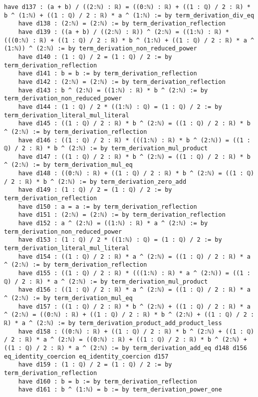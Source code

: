 \documentclass{article}
\begin{document}
\begin{tcolorbox}[colback=white!10, width=\linewidth]
\begin{lstlisting}[language=Lean4]
    have d137 : (a + b) / ((2:ℕ) : ℝ) = ((0:ℕ) : ℝ) + ((1 : ℚ) / 2 : ℝ) * b ^ (1:ℕ) + ((1 : ℚ) / 2 : ℝ) * a ^ (1:ℕ) := by term_derivation_div_eq
    have d138 : (2:ℕ) = (2:ℕ) := by term_derivation_reflection
    have d139 : ((a + b) / ((2:ℕ) : ℝ)) ^ (2:ℕ) = ((1:ℕ) : ℝ) * (((0:ℕ) : ℝ) + ((1 : ℚ) / 2 : ℝ) * b ^ (1:ℕ) + ((1 : ℚ) / 2 : ℝ) * a ^ (1:ℕ)) ^ (2:ℕ) := by term_derivation_non_reduced_power
    have d140 : (1 : ℚ) / 2 = (1 : ℚ) / 2 := by term_derivation_reflection
    have d141 : b = b := by term_derivation_reflection
    have d142 : (2:ℕ) = (2:ℕ) := by term_derivation_reflection
    have d143 : b ^ (2:ℕ) = ((1:ℕ) : ℝ) * b ^ (2:ℕ) := by term_derivation_non_reduced_power
    have d144 : (1 : ℚ) / 2 * ((1:ℕ) : ℚ) = (1 : ℚ) / 2 := by term_derivation_literal_mul_literal
    have d145 : ((1 : ℚ) / 2 : ℝ) * b ^ (2:ℕ) = ((1 : ℚ) / 2 : ℝ) * b ^ (2:ℕ) := by term_derivation_reflection
    have d146 : ((1 : ℚ) / 2 : ℝ) * (((1:ℕ) : ℝ) * b ^ (2:ℕ)) = ((1 : ℚ) / 2 : ℝ) * b ^ (2:ℕ) := by term_derivation_mul_product
    have d147 : ((1 : ℚ) / 2 : ℝ) * b ^ (2:ℕ) = ((1 : ℚ) / 2 : ℝ) * b ^ (2:ℕ) := by term_derivation_mul_eq
    have d148 : ((0:ℕ) : ℝ) + ((1 : ℚ) / 2 : ℝ) * b ^ (2:ℕ) = ((1 : ℚ) / 2 : ℝ) * b ^ (2:ℕ) := by term_derivation_zero_add
    have d149 : (1 : ℚ) / 2 = (1 : ℚ) / 2 := by term_derivation_reflection
    have d150 : a = a := by term_derivation_reflection
    have d151 : (2:ℕ) = (2:ℕ) := by term_derivation_reflection
    have d152 : a ^ (2:ℕ) = ((1:ℕ) : ℝ) * a ^ (2:ℕ) := by term_derivation_non_reduced_power
    have d153 : (1 : ℚ) / 2 * ((1:ℕ) : ℚ) = (1 : ℚ) / 2 := by term_derivation_literal_mul_literal
    have d154 : ((1 : ℚ) / 2 : ℝ) * a ^ (2:ℕ) = ((1 : ℚ) / 2 : ℝ) * a ^ (2:ℕ) := by term_derivation_reflection
    have d155 : ((1 : ℚ) / 2 : ℝ) * (((1:ℕ) : ℝ) * a ^ (2:ℕ)) = ((1 : ℚ) / 2 : ℝ) * a ^ (2:ℕ) := by term_derivation_mul_product
    have d156 : ((1 : ℚ) / 2 : ℝ) * a ^ (2:ℕ) = ((1 : ℚ) / 2 : ℝ) * a ^ (2:ℕ) := by term_derivation_mul_eq
    have d157 : ((1 : ℚ) / 2 : ℝ) * b ^ (2:ℕ) + ((1 : ℚ) / 2 : ℝ) * a ^ (2:ℕ) = ((0:ℕ) : ℝ) + ((1 : ℚ) / 2 : ℝ) * b ^ (2:ℕ) + ((1 : ℚ) / 2 : ℝ) * a ^ (2:ℕ) := by term_derivation_product_add_product_less
    have d158 : ((0:ℕ) : ℝ) + ((1 : ℚ) / 2 : ℝ) * b ^ (2:ℕ) + ((1 : ℚ) / 2 : ℝ) * a ^ (2:ℕ) = ((0:ℕ) : ℝ) + ((1 : ℚ) / 2 : ℝ) * b ^ (2:ℕ) + ((1 : ℚ) / 2 : ℝ) * a ^ (2:ℕ) := by term_derivation_add_eq d148 d156 eq_identity_coercion eq_identity_coercion d157
    have d159 : (1 : ℚ) / 2 = (1 : ℚ) / 2 := by term_derivation_reflection
    have d160 : b = b := by term_derivation_reflection
    have d161 : b ^ (1:ℕ) = b := by term_derivation_power_one

\end{lstlisting}
\end{tcolorbox}
\end{document}
